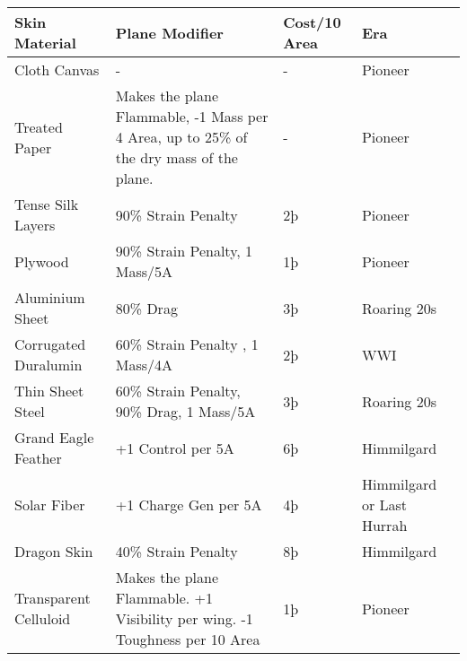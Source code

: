 \documentclass{article}
\begin{document}
\begin{tabular}{|l|l|l|l|}
    \hline
    Skin Material                      & Plane Modifier                                       & Cost/10 Area & Era                       \\\hline
    Cloth Canvas                       & -                                                    & -            & Pioneer                   \\\hline
    Treated Paper                      & Makes the plane Flammable, -1 Mass per 4 Area, up to
    25\% of the dry mass of the plane. & -                                                    & Pioneer                                  \\\hline
    Tense Silk Layers                  & 90\% Strain Penalty                                  & 2þ           & Pioneer                   \\\hline
    Plywood                            & 90\% Strain Penalty, 1 Mass/5A                       & 1þ           & Pioneer                   \\\hline
    Aluminium Sheet                    & 80\% Drag                                            & 3þ           & Roaring 20s               \\\hline
    Corrugated Duralumin               & 60\% Strain Penalty , 1 Mass/4A                      & 2þ           & WWI                       \\\hline
    Thin Sheet Steel                   & 60\% Strain Penalty, 90\% Drag, 1 Mass/5A            & 3þ           &
    Roaring 20s                                                                                                                          \\\hline
    Grand Eagle Feather                & +1 Control per 5A                                    & 6þ           & Himmilgard                \\\hline
    Solar Fiber                        & +1 Charge Gen per 5A                                 & 4þ           & Himmilgard or Last Hurrah \\\hline
    Dragon Skin                        & 40\% Strain Penalty                                  & 8þ           & Himmilgard                \\\hline
    Transparent Celluloid              & Makes the plane Flammable. +1 Visibility per
    wing. -1 Toughness per 10 Area     & 1þ                                                   & Pioneer                                  \\\hline
\end{tabular}
\end{document}
